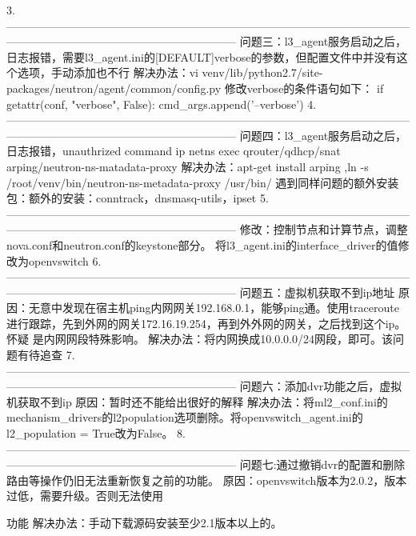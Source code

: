 \documentclass[a4paper,left=1.5cm,right=1.5cm,11pt]{article}
\begin{document}
3.--------------------------------------------------------------------------------------------------------------------------------------------------------------------------
	问题三：l3_agent服务启动之后，日志报错，需要l3_agent.ini的[DEFAULT]verbose的参数，但配置文件中并没有这个选项，手动添加也不行
	解决办法：vi venv/lib/python2.7/site-packages/neutron/agent/common/config.py  
	修改verbose的条件语句如下：
	if getattr(conf, "verbose", False):
        cmd_args.append('--verbose')
4.--------------------------------------------------------------------------------------------------------------------------------------------------------------------------
	问题四：l3_agent服务启动之后，日志报错，unauthrized command ip netns exec qrouter/qdhcp/snat arping/neutron-ns-matadata-proxy
	解决办法：apt-get install arping ,ln -s /root/venv/bin/neutron-ns-metadata-proxy /usr/bin/
	遇到同样问题的额外安装包：额外的安装：conntrack，dnsmasq-utils，ipset
5.--------------------------------------------------------------------------------------------------------------------------------------------------------------------------
	修改：控制节点和计算节点，调整nova.conf和neutron.conf的keystone部分。
	将l3_agent.ini的interface_driver的值修改为openvswitch
6.--------------------------------------------------------------------------------------------------------------------------------------------------------------------------
	问题五：虚拟机获取不到ip地址
	原因：无意中发现在宿主机ping内网网关192.168.0.1，能够ping通。使用traceroute进行跟踪，先到外网的网关172.16.19.254，再到外外网的网关，之后找到这个ip。怀疑
	是内网网段特殊影响。
	解决办法：将内网换成10.0.0.0/24网段，即可。该问题有待追查
7.--------------------------------------------------------------------------------------------------------------------------------------------------------------------------
	问题六：添加dvr功能之后，虚拟机获取不到ip
	原因：暂时还不能给出很好的解释
	解决办法：将ml2_conf.ini的mechanism_drivers的l2population选项删除。将openvswitch_agent.ini的l2_population = True改为False。
8.--------------------------------------------------------------------------------------------------------------------------------------------------------------------------
	问题七:通过撤销dvr的配置和删除路由等操作仍旧无法重新恢复之前的功能。
	原因：openvswitch版本为2.0.2，版本过低，需要升级。否则无法使用
	
	功能
	解决办法：手动下载源码安装至少2.1版本以上的。
	
\end{document}
